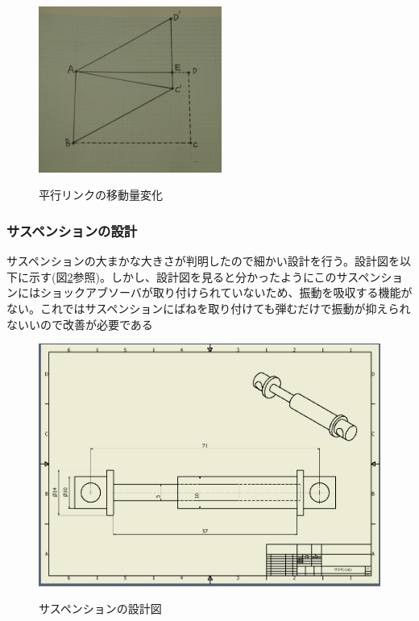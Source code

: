 \documentclass[11pt]{jsarticle}
\begin{document}
\begin{figure}[htbt]
 \begin{center}
  \includegraphics[width=60mm]{rink.jpg}
 　\caption{平行リンクの移動量変化}
  \label{fig:rink}%
 \end{center}
\end{figure}








\subsubsection{サスペンションの設計}
サスペンションの大まかな大きさが判明したので細かい設計を行う。設計図を以下に示す(図\ref{fig:saspention}参照)。しかし、設計図を見ると分かったようにこのサスペンションにはショックアブソーバが取り付けられていないため、振動を吸収する機能がない。これではサスペンションにばねを取り付けても弾むだけで振動が抑えられないいので改善が必要である
\begin{figure}[htbt]
 \begin{center}
  \includegraphics[width=120mm]{saspention.png}
 　\caption{サスペンションの設計図}
  \label{fig:saspention}%
 \end{center}
\end{figure}
\end{document}
